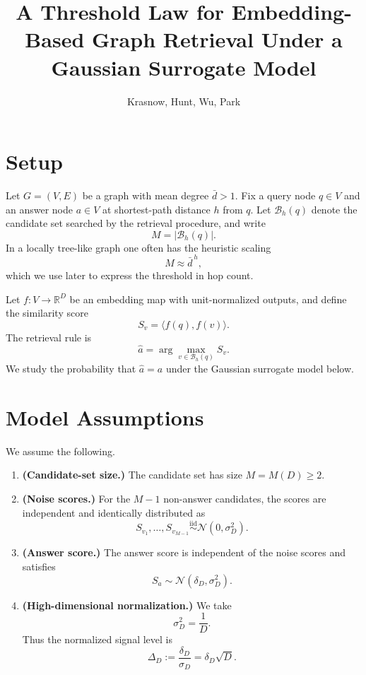 \documentclass[11pt]{article}
\title{A Threshold Law for Embedding-Based Graph Retrieval Under a Gaussian Surrogate Model}
\author{Krasnow, Hunt, Wu, Park}
\date{}
\begin{document}
\maketitle

\section{Setup}

Let $G=(V,E)$ be a graph with mean degree $\bar d > 1$. Fix a query node $q \in V$ and an answer node $a \in V$ at shortest-path distance $h$ from $q$. Let $\mathcal{B}_h(q)$ denote the candidate set searched by the retrieval procedure, and write
\[
M = |\mathcal{B}_h(q)|.
\]
In a locally tree-like graph one often has the heuristic scaling
\[
M \approx \bar d^{\,h},
\]
which we use later to express the threshold in hop count.

Let $f:V\to\mathbb{R}^D$ be an embedding map with unit-normalized outputs, and define the similarity score
\[
S_v = \langle f(q), f(v)\rangle.
\]
The retrieval rule is
\[
\hat a = \arg\max_{v\in \mathcal{B}_h(q)} S_v.
\]
We study the probability that $\hat a = a$ under the Gaussian surrogate model below.

\section{Model Assumptions}

We assume the following.

\begin{enumerate}
    \item[\textbf{A1.}] \textbf{(Candidate-set size.)}
    The candidate set has size $M=M(D)\ge 2$.

    \item[\textbf{A2.}] \textbf{(Noise scores.)}
    For the $M-1$ non-answer candidates, the scores are independent and identically distributed as
    \[
    S_{v_1},\dots,S_{v_{M-1}} \stackrel{\mathrm{iid}}{\sim} \mathcal{N}(0,\sigma_D^2).
    \]

    \item[\textbf{A3.}] \textbf{(Answer score.)}
    The answer score is independent of the noise scores and satisfies
    \[
    S_a \sim \mathcal{N}(\delta_D,\sigma_D^2).
    \]

    \item[\textbf{A4.}] \textbf{(High-dimensional normalization.)}
    We take
    \[
    \sigma_D^2 = \frac{1}{D}.
    \]
    Thus the normalized signal level is
    \[
    \Delta_D := \frac{\delta_D}{\sigma_D} = \delta_D \sqrt{D}.
    \]
\end{enumerate}
\end{document}
